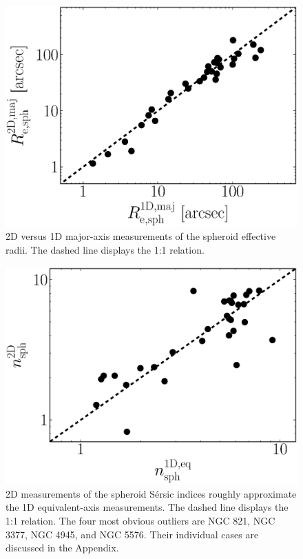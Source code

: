 \documentclass[preprint2]{emulateapj}
\begin{document}
\begin{figure}[h]
\begin{center}
\includegraphics[width=\columnwidth]{comparison_r_e.eps} 
\caption{2D versus 1D major-axis measurements of the spheroid effective radii. 
The dashed line displays the 1:1 relation.}
\label{fig:re1d2d}
\end{center}
\end{figure}

\begin{figure}[h]
\begin{center}
\includegraphics[width=\columnwidth]{comparison_n.eps} 
\caption{2D measurements of the spheroid S\'ersic indices roughly approximate the 1D equivalent-axis measurements. 
The dashed line displays the 1:1 relation.
The four most obvious outliers are NGC 821, NGC 3377, NGC 4945, and NGC 5576. 
Their individual cases are discussed in the Appendix. }
\label{fig:n1d2d}
\end{center}
\end{figure}
\end{document}
